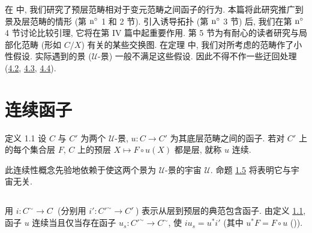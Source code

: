 在\pageoriginale{}  中, 我们研究了预层范畴相对于变元范畴之间函子的行为.
本篇将此研究推广到景及层范畴的情形 (第 ${\rm n^{\circ}}$ 1 和 2 节).
引入诱导拓扑 (第 ${\rm n^{\circ}}$ 3 节) 后, 我们在第 ${\rm n^{\circ}}$ 4 节讨论比较引理,
它将在第 IV 篇中起重要作用. 第 5 节为有耐心的读者研究与局部化范畴
(形如 $C/X$) 有关的某些交换图.
在定理  中, 我们对所考虑的范畴作了小性假设.
实际遇到的景 ($𝒰$-景) 一般不满足这些假设.
因此不得不作一些迂回处理 (\hyperref[III.subsec4.2]{4.2}, \hyperref[III.subsec4.3]{4.3},
\hyperref[III.subsec4.4]{4.4}).

\section{连续函子}

\begin{enonce*}{定义 1.1}
设 $C$ 与 $C'$ 为两个 $𝒰$-景, $u:C\rightarrow C'$ 为其底层范畴之间的函子.
若对 $C'$ 上的每个集合层 $F$, $C$ 上的预层 $X\mapsto F\circ u(X)$ 都是层,
就称 $u$ 连续.
\end{enonce*}

此连续性概念先验地依赖于使这两个景为 $𝒰$-景的宇宙 $𝒰$.
命题 \hyperref[III.prop1.5]{1.5} 将表明它与宇宙无关.

\setcounter{subsection}{10}
\subsection{}
用\pageoriginale{} $i:C^{\sim}\rightarrow C^{\widehat{\phantom{,}}}$
(分别用 $i':{C'}^{\sim}\rightarrow {C'}^{\widehat{\phantom{,}}}$)
表示从层到预层的典范包含函子. 由定义 \hyperref[III.def1.1]{1.1},
函子 $u$ 连续当且仅当存在函子 $u_s:{C'}^{\sim}\rightarrow C^{\sim}$,
使 $iu_s=u^\ast i'$ (其中 $u^\ast F=F\circ u$
()).

